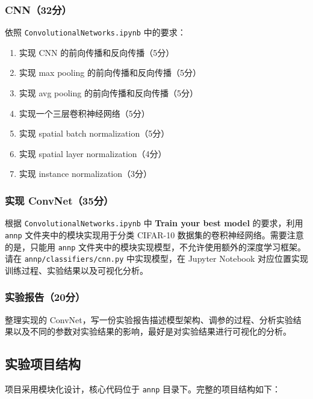 \documentclass[a4paper]{article}
\begin{document}
\subsubsection{CNN（32分）}

依照 \texttt{ConvolutionalNetworks.ipynb} 中的要求：
\begin{enumerate}
    \item 实现 CNN 的前向传播和反向传播（5分）
    \item 实现 max pooling 的前向传播和反向传播（5分）
    \item 实现 avg pooling 的前向传播和反向传播（5分）
    \item 实现一个三层卷积神经网络（5分）
    \item 实现 spatial batch normalization（5分）
    \item 实现 spatial layer normalization（4分）
    \item 实现 instance normalization（3分）
\end{enumerate}

\subsubsection{实现 ConvNet（35分）}

根据 \texttt{ConvolutionalNetworks.ipynb} 中 \textbf{Train your best model} 的要求，利用 \texttt{annp} 文件夹中的模块实现用于分类 CIFAR-10 数据集的卷积神经网络。需要注意的是，只能用 \texttt{annp} 文件夹中的模块实现模型，不允许使用额外的深度学习框架。请在 \texttt{annp/classifiers/cnn.py} 中实现模型，在 Jupyter Notebook 对应位置实现训练过程、实验结果以及可视化分析。

\subsubsection{实验报告（20分）}

整理实现的 ConvNet，写一份实验报告描述模型架构、调参的过程、分析实验结果以及不同的参数对实验结果的影响，最好是对实验结果进行可视化的分析。

\subsection{实验项目结构}

项目采用模块化设计，核心代码位于 \texttt{annp} 目录下。完整的项目结构如下：
\end{document}
